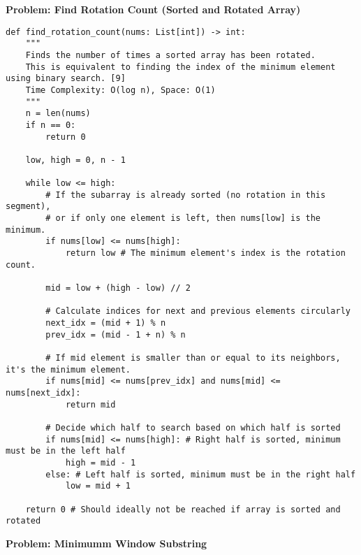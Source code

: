 \noindent\textbf{Problem: Find Rotation Count (Sorted and Rotated Array)}
\begin{verbatim}
def find_rotation_count(nums: List[int]) -> int:
    """
    Finds the number of times a sorted array has been rotated.
    This is equivalent to finding the index of the minimum element using binary search. [9]
    Time Complexity: O(log n), Space: O(1)
    """
    n = len(nums)
    if n == 0:
        return 0
    
    low, high = 0, n - 1
    
    while low <= high:
        # If the subarray is already sorted (no rotation in this segment),
        # or if only one element is left, then nums[low] is the minimum.
        if nums[low] <= nums[high]:
            return low # The minimum element's index is the rotation count.

        mid = low + (high - low) // 2
        
        # Calculate indices for next and previous elements circularly
        next_idx = (mid + 1) % n 
        prev_idx = (mid - 1 + n) % n 

        # If mid element is smaller than or equal to its neighbors, it's the minimum element.
        if nums[mid] <= nums[prev_idx] and nums[mid] <= nums[next_idx]:
            return mid
        
        # Decide which half to search based on which half is sorted
        if nums[mid] <= nums[high]: # Right half is sorted, minimum must be in the left half
            high = mid - 1
        else: # Left half is sorted, minimum must be in the right half
            low = mid + 1
            
    return 0 # Should ideally not be reached if array is sorted and rotated
\end{verbatim}
\noindent\textbf{Problem: Minimumm Window Substring }
